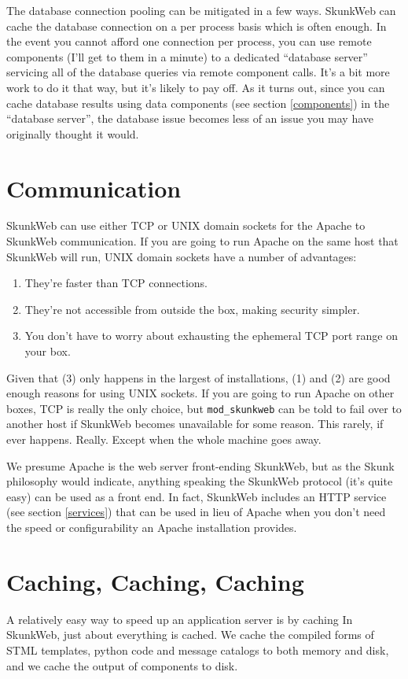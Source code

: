 \documentclass[twocolumn]{article}
\begin{document}
The database connection pooling can be mitigated in a few ways.
SkunkWeb can cache the database connection on a per process basis
which is often enough.  In the event you cannot afford one
connection per process, you can use remote components (I'll get to
them in a minute) to a dedicated ``database server'' servicing all of
the database queries via remote component calls.  It's a bit more work
to do it that way, but it's likely to pay off.  As it turns out, since
you can cache database results using data components (see section
\ref{components}) in the ``database server'', the database issue
becomes less of an issue you may have originally thought it would.

\section{Communication}
SkunkWeb can use either TCP or UNIX domain sockets for the
Apache\cite{apache} to SkunkWeb communication.  If you are going to run
Apache on the same host that SkunkWeb will run, UNIX domain
sockets have a number of advantages:
\begin{enumerate}
\item They're faster than TCP connections.
\item They're not accessible from outside the box, making security
simpler.
\item You don't have to worry about exhausting the ephemeral TCP port
range on your box.
\end{enumerate}
Given that (3) only happens in the largest of installations, (1) and
(2) are good enough reasons for using UNIX sockets.  If you are going
to run Apache on other boxes, TCP is really the only choice, but
\texttt{mod\_skunkweb} can be told to fail over to another host if
SkunkWeb becomes unavailable for some reason.  This rarely, if ever
happens. Really.  Except when the whole machine goes away.

We presume Apache is the web server front-ending SkunkWeb, but as the
Skunk philosophy would indicate, anything speaking the SkunkWeb
protocol (it's quite easy) can be used as a front end.  In fact,
SkunkWeb includes an HTTP service (see section \ref{services}) that
can be used in lieu of Apache when you don't need the speed or
configurability an Apache installation provides.
 
\section{Caching, Caching, Caching}
A relatively easy way to speed up an application server is by
caching  In SkunkWeb, just about everything is
cached.  We cache the compiled forms of STML templates, python code
and message catalogs to both memory and disk, and we cache the output
of components to disk.
\end{document}
